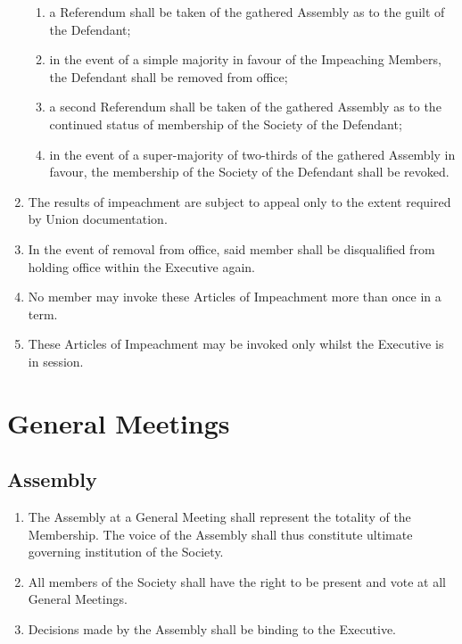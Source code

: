 \documentclass{scrartcl}
\begin{document}
\begin{enumerate}
\begin{enumerate}
                        \item a Referendum shall be taken of the gathered Assembly as to the guilt of the Defendant;
                        \item in the event of a simple majority in favour of the Impeaching Members, the Defendant shall be removed from office;
                        \item a second Referendum shall be taken of the gathered Assembly as to the continued status of membership of the Society of the Defendant;
                        \item in the event of a super-majority of two-thirds of the gathered Assembly in favour, the membership of the Society of the Defendant shall be revoked.
                    \end{enumerate}
                \item The results of impeachment are subject to appeal only to the extent required by Union documentation.
                \item In the event of removal from office, said member shall be disqualified from holding office within the Executive again.
                \item No member may invoke these Articles of Impeachment more than once in a term.
                \item These Articles of Impeachment may be invoked only whilst the Executive is in session.
            \end{enumerate}

    \clearpage
    \section{General Meetings}
        \label{gm}
        \subsection{Assembly}
            \label{gm--assembly}
            \begin{enumerate}
                \item The Assembly at a General Meeting shall represent the totality of the Membership.
                    \subitem The voice of the Assembly shall thus constitute ultimate governing institution of the Society.
                \item All members of the Society shall have the right to be present and vote at all General Meetings.
                \item Decisions made by the Assembly shall be binding to the Executive.
            \end{enumerate}
\end{document}
